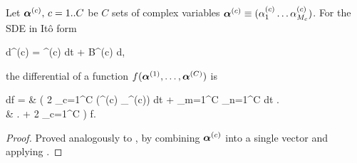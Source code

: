 \begin{theorem}
\label{thm:wigner-bec:ito-formula:mc-ito-f}
	Let $\boldsymbol{\alpha}^{(c)},\, c = 1..C$ be $C$ sets of complex variables $\boldsymbol{\alpha}^{(c)} \equiv (\alpha_1^{(c)} \ldots \alpha_{M_c}^{(c)})$.
	For the SDE in It\^{o} form
	\begin{eqn*}
		d\balpha^{(c)} = \avec^{(c)} dt + B^{(c)} d\Zvec,
	\end{eqn*}
	the differential of a function $f(\boldsymbol{\alpha}^{(1)}, \ldots, \boldsymbol{\alpha}^{(C)})$ is
	\begin{eqn*}
		df ={} & \left(
			2 \sum_{c=1}^C \Real (\avec^{(c)} \cdot \bpartial_{\balpha^{(c)}}) dt
			+ \sum_{m=1}^C \sum_{n=1}^C  dt \right. \\
		& \left. + 2 \sum_{c=1}^C \Real \Trace{ B^{(c)} d\Zvec \bpartial_{\balpha^{(c)}}^T }
		\right) f.
	\end{eqn*}
\end{theorem}
\begin{proof}
Proved analogously to , by combining $\boldsymbol{\alpha}^{(c)}$ into a single vector	and applying .
\end{proof}

